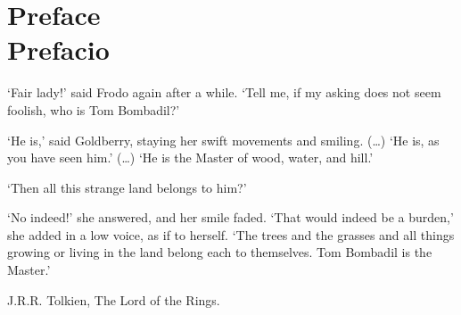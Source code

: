 \chapter*{Preface\\ Prefacio}
\sloppy
\epigraph{`Fair lady!' said Frodo again after a while. `Tell me, if my asking does not seem foolish, who is Tom Bombadil?'

`He is,' said Goldberry, staying her swift movements and smiling. (\ldots) `He is, as you have seen him.' (\ldots) `He is the Master of wood, water, and hill.'

`Then all this strange land belongs to him?'

`No indeed!' she answered, and her smile faded. `That would indeed be a burden,' she added in a low voice, as if to herself. `The trees and the grasses and all things growing or living in the land belong each to themselves. Tom Bombadil is the Master.'}{J.R.R. Tolkien, The Lord of the Rings.}
